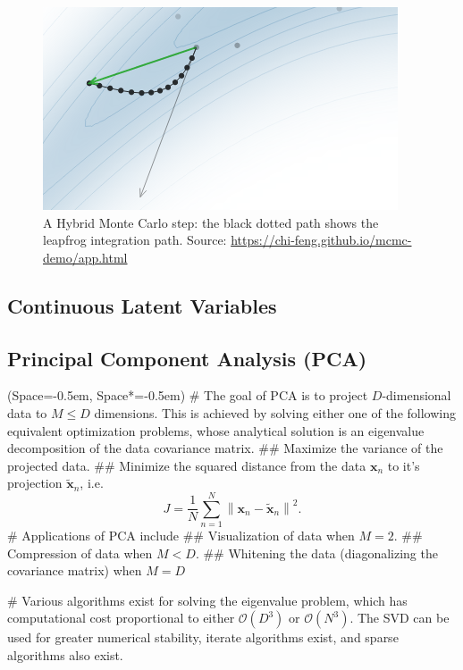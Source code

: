 \documentclass[12pt, a4paper]{article}
\newcommand{\listSpace}{-0.5em}%
\newcommand{\vect}[1]{\bm{#1}}
\newcommand{\norm}[1]{\left\lVert#1\right\rVert}
\begin{document}
		\begin{figure}[ht!]
			\centering
			\includegraphics[width=0.5\linewidth]{figs/HMC.png}
			\caption{A Hybrid Monte Carlo step: the black dotted path shows the leapfrog integration path.
				Source: \url{https://chi-feng.github.io/mcmc-demo/app.html}}
			\label{fig:HMC}
		\end{figure}

\subsection{Continuous Latent Variables}


\subsection*{Principal Component Analysis (PCA)}
\begin{easylist}[itemize]
	\ListProperties(Space=\listSpace, Space*=\listSpace)
	# The goal of PCA is to project $D$-dimensional data to $M \leq D$ dimensions.
	This is achieved by solving either one of the following equivalent optimization problems, whose analytical solution is an eigenvalue decomposition of the data covariance matrix.
	## Maximize the variance of the projected data.
	## Minimize the squared distance from the data $\vect{x}_n$ to it's projection $\tilde{\vect{x}}_n$, i.e.
	\begin{equation*}
		J = \frac{1}{N} \sum_{n=1}^{N} \norm{\vect{x}_n - \tilde{\vect{x}}_n}^2.
	\end{equation*}
	# Applications of PCA include 
	## Visualization of data when $M=2$.
	## Compression of data when $M < D$.
	## Whitening the data (diagonalizing the covariance matrix) when $M=D$ 
	
	# Various algorithms exist for solving the eigenvalue problem, which has computational cost proportional to either $\mathcal{O}(D^3)$ or $\mathcal{O}(N^3)$.
	The SVD can be used for greater numerical stability, iterate algorithms exist, and sparse algorithms also exist.
\end{easylist}
\end{document}
